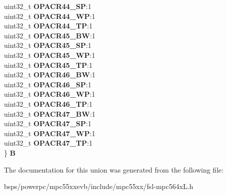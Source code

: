 \begin{DoxyCompactItemize}
\begin{tabbing}
\>uint32\_t {\bfseries OPACR44\_SP}:1\\
\>uint32\_t {\bfseries OPACR44\_WP}:1\\
\>uint32\_t {\bfseries OPACR44\_TP}:1\\
\>uint32\_t {\bfseries OPACR45\_BW}:1\\
\>uint32\_t {\bfseries OPACR45\_SP}:1\\
\>uint32\_t {\bfseries OPACR45\_WP}:1\\
\>uint32\_t {\bfseries OPACR45\_TP}:1\\
\>uint32\_t {\bfseries OPACR46\_BW}:1\\
\>uint32\_t {\bfseries OPACR46\_SP}:1\\
\>uint32\_t {\bfseries OPACR46\_WP}:1\\
\>uint32\_t {\bfseries OPACR46\_TP}:1\\
\>uint32\_t {\bfseries OPACR47\_BW}:1\\
\>uint32\_t {\bfseries OPACR47\_SP}:1\\
\>uint32\_t {\bfseries OPACR47\_WP}:1\\
\>uint32\_t {\bfseries OPACR47\_TP}:1\\
\} {\bfseries B}\\

\end{tabbing}\end{DoxyCompactItemize}


The documentation for this union was generated from the following file\+:\begin{DoxyCompactItemize}
\item 
bsps/powerpc/mpc55xxevb/include/mpc55xx/fsl-\/mpc564x\+L.\+h\end{DoxyCompactItemize}
